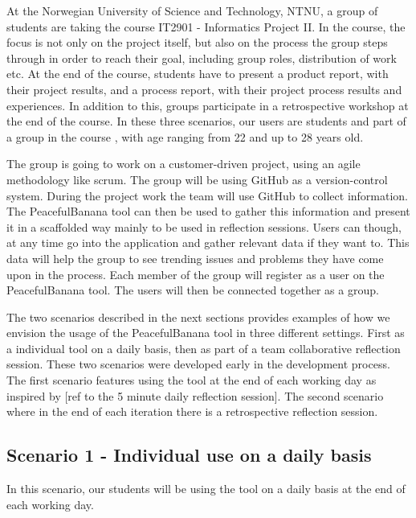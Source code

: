At the Norwegian University of Science and Technology, NTNU, a group of students are taking the course IT2901 - Informatics Project II\footnotemark.
In the course, the focus is not only on the project itself, but also on the process the group steps through in order to reach their goal, including group roles, distribution of work etc. At the end of the course, students have to present a product report, with their project results, and a process report, with their project process results and experiences. In addition to this, groups participate in a retrospective workshop at the end of the course. In these three scenarios, our users are students and part of a group in the course , with age ranging from 22 and up to 28 years old.

The group is going to work on a customer-driven project, using an agile methodology like scrum. The group will be using GitHub as a version-control system. During the project work the team will use GitHub to collect information. The PeacefulBanana tool can then be used to gather this information and present it in a scaffolded way mainly to be used in reflection sessions. Users can though, at any time go into the application and gather relevant data if they want to. This data will help the group to see trending issues and problems they have come upon in the process. Each member of the group will register as a user on the PeacefulBanana tool. The users will then be connected together as a group. 

The two scenarios described in the next sections provides examples of how we envision the usage of the PeacefulBanana tool in three different settings. First as a individual tool on a daily basis, then as part of a team collaborative reflection session.
These two scenarios were developed early in the development process. The first scenario features using the tool at the end of each working day as inspired by [ref to the 5 minute daily reflection session]. The second scenario where in the end of each iteration there is a retrospective reflection session. 



\subsection{Scenario 1 - Individual use on a daily basis}
\label{scenario1}
In this scenario, our students will be using the tool on a daily basis at the end of each working day.

